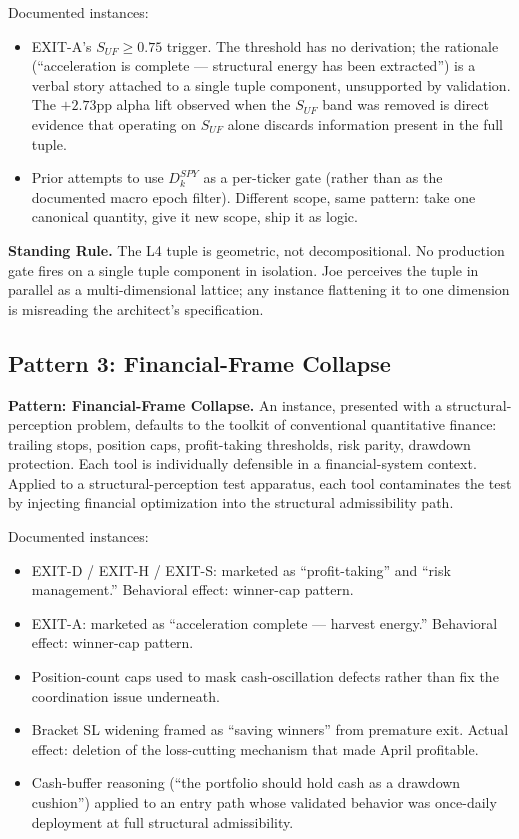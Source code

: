 \documentclass[11pt, a4paper]{article}
\newcommand{\rulebox}[1]{%
  \begin{framed}\noindent\textbf{Standing Rule.} #1\end{framed}}
\newcommand{\patternbox}[2]{%
  \begin{framed}\noindent\textbf{Pattern: #1.} #2\end{framed}}
\theoremstyle{definition}
\begin{document}
Documented instances:

\begin{itemize}
\item EXIT-A's $S_{UF} \geq 0.75$ trigger. The threshold has no derivation;
the rationale (``acceleration is complete --- structural energy has been
extracted'') is a verbal story attached to a single tuple component,
unsupported by validation. The $+2.73$pp alpha lift observed when the
$S_{UF}$ band was removed is direct evidence that operating on $S_{UF}$ alone
discards information present in the full tuple.

\item Prior attempts to use $D_k^{SPY}$ as a per-ticker gate (rather than as
the documented macro epoch filter). Different scope, same pattern: take one
canonical quantity, give it new scope, ship it as logic.
\end{itemize}

\rulebox{The L4 tuple is geometric, not decompositional. No production gate
fires on a single tuple component in isolation. Joe perceives the tuple in
parallel as a multi-dimensional lattice; any instance flattening it to one
dimension is misreading the architect's specification.}

\subsection{Pattern 3: Financial-Frame Collapse}

\patternbox{Financial-Frame Collapse}{An instance, presented with a
structural-perception problem, defaults to the toolkit of conventional
quantitative finance: trailing stops, position caps, profit-taking
thresholds, risk parity, drawdown protection. Each tool is individually
defensible in a financial-system context. Applied to a structural-perception
test apparatus, each tool contaminates the test by injecting financial
optimization into the structural admissibility path.}

Documented instances:

\begin{itemize}
\item EXIT-D / EXIT-H / EXIT-S: marketed as ``profit-taking'' and
``risk management.'' Behavioral effect: winner-cap pattern.
\item EXIT-A: marketed as ``acceleration complete --- harvest energy.''
Behavioral effect: winner-cap pattern.
\item Position-count caps used to mask cash-oscillation defects rather than
fix the coordination issue underneath.
\item Bracket SL widening framed as ``saving winners'' from premature exit.
Actual effect: deletion of the loss-cutting mechanism that made April
profitable.
\item Cash-buffer reasoning (``the portfolio should hold cash as a drawdown
cushion'') applied to an entry path whose validated behavior was once-daily
deployment at full structural admissibility.
\end{itemize}
\end{document}
